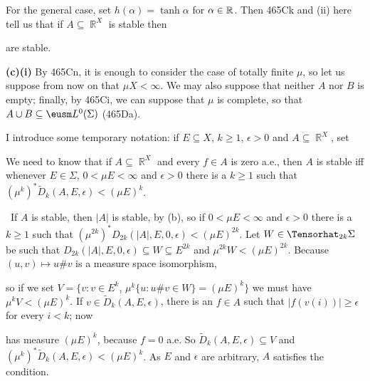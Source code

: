 { For the general case, set $h(\alpha)=\tanh\alpha$ for
$\alpha\in\Bbb R$.   Then 465Ck and (ii) here tell us that if
$A\subseteq\BbbR^X$ is stable then


\noindent are stable.

\medskip

{\bf (c)(i)} By 465Cn, it is enough to consider the case of totally finite
$\mu$, so let us suppose from now on that $\mu X<\infty$.   We may also
suppose that neither $A$ nor $B$ is empty;  finally, by 465Ci,
we can suppose that $\mu$ is complete, so that
$A\cup B\subseteq\eusm L^0(\Sigma)$ (465Da).

I introduce some temporary notation:  if $E\subseteq X$, $k\ge 1$,
$\epsilon>0$ and $A\subseteq\BbbR^X$, set


\medskip

 We need to know that if $A\subseteq\BbbR^X$ and every
$f\in A$ is zero a.e., then $A$ is stable iff whenever $E\in\Sigma$,
$0<\mu E<\infty$ and $\epsilon>0$ there is a $k\ge 1$ such that
$(\mu^k)^*\tilde D_k(A,E,\epsilon)<(\mu E)^k$.

\medskip

\quad\Prf\grheada\ If $A$ is stable, then $|A|$ is stable,
by (b), so if $0<\mu E<\infty$ and $\epsilon>0$ there is a $k\ge 1$ such
that $(\mu^{2k})^*D_{2k}(|A|,E,0,\epsilon)<(\mu E)^{2k}$.   Let
$W\in\Tensorhat_{2k}\Sigma$ be such that
$D_{2k}(|A|,E,0,\epsilon)\subseteq W\subseteq E^{2k}$
and $\mu^{2k}W<(\mu E)^{2k}$.   Because $(u,v)\mapsto u\#v$ is a measure
space isomorphism,


\noindent so if we set
$V=\{v:v\in E^k$, $\mu^k\{u:u\#v\in W\}=(\mu E)^k\}$ we must have
$\mu^kV<(\mu E)^k$.   If
$v\in\tilde D_k(A,E,\epsilon)$, there is an $f\in A$ such that
$|f(v(i))|\ge\epsilon$ for every $i<k$;  now


\noindent has measure $(\mu E)^k$, because $f=0$ a.e.   So
$\tilde D_k(A,E,\epsilon)\subseteq V$ and
$(\mu^k)^*\tilde D_k(A,E,\epsilon)<(\mu E)^k$.
As $E$ and $\epsilon$ are arbitrary, $A$ satisfies the
condition.

}
